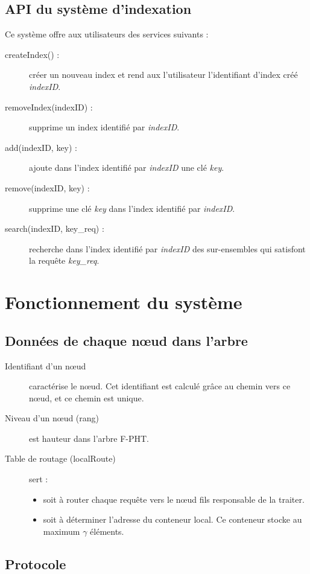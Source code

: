 \documentclass[a4paper,11pt]{report}
\begin{document}
\section{API du système d'indexation}
	Ce système offre aux utilisateurs des services suivants :
	\begin{description}
		\item[	createIndex() 	 :] créer un nouveau index et rend aux l'utilisateur l'identifiant d'index créé \textit{indexID}.
		\item[	removeIndex(indexID)	 :] supprime un index identifié par \textit{indexID}.
		\item[	add(indexID, key) 		 :] ajoute dans l'index identifié par \textit{indexID} une clé \textit{key}.
		\item[	remove(indexID, key)  :] supprime une clé \textit{key} dans l'index identifié par \textit{indexID}.
		\item[	search(indexID, key\_req) 	 :] recherche dans l'index identifié par \textit{indexID} des sur-ensembles qui satisfont la requête \textit{key\_req}.
	\end{description}

	
\chapter{Fonctionnement du système}
\section{Données de chaque nœud dans l'arbre}
	\begin{description}
		\item[Identifiant d'un nœud] caractérise le nœud. Cet identifiant est calculé grâce au chemin vers ce nœud, et ce chemin est unique.
		\item[Niveau d'un nœud (rang)]  est hauteur dans l'arbre F-PHT.
		\item[Table de routage (localRoute)] sert :
			\begin{itemize}
				\item soit à router chaque requête vers le nœud fils responsable de la traiter.
				\item soit à déterminer l'adresse du conteneur local. Ce conteneur stocke au maximum $\gamma$ éléments.
			\end{itemize}
	\end{description}


\section{Protocole}
\end{document}
